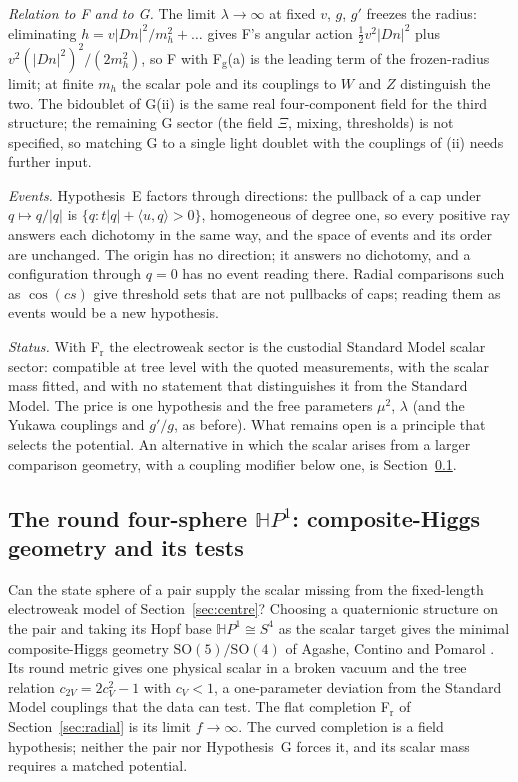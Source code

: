 \documentclass[aps,pra,onecolumn,superscriptaddress,nofootinbib,10pt]{revtex4-2}
\theoremstyle{definition}
\theoremstyle{remark}
\newcommand{\HH}{\mathbb{H}}
\newcommand{\ip}[2]{\langle #1,#2\rangle}
\newcommand{\SO}{\mathrm{SO}}
\begin{document}
\smallskip\noindent\emph{Relation to F and to G.}  The limit $\lambda\to\infty$ at fixed $v$, $g$, $g'$ freezes the radius:
eliminating $h=v\lvert Dn\rvert^2/m_h^2+\dots$ gives F's angular action $\tfrac12v^2\lvert Dn\rvert^2$ plus $v^2(\lvert Dn\rvert^2)^2/(2m_h^2)$, so F
with F$_{\mathrm g}$(a) is the leading term of the frozen-radius limit; at finite $m_h$ the scalar pole and its
couplings to $W$ and $Z$ distinguish the two.  The bidoublet of G(ii) is the same real four-component
field for the third structure; the remaining G sector (the field $\Xi$, mixing, thresholds) is not
specified, so matching G to a single light doublet with the couplings of (ii) needs further input.

\smallskip\noindent\emph{Events.}  Hypothesis~E factors through directions: the pullback of a cap under $q\mapsto q/\lvert q\rvert$
is $\{q:t\lvert q\rvert+\ip uq>0\}$, homogeneous of degree one, so every positive ray answers each dichotomy in the
same way, and the space of events and its order are unchanged.  The origin has no direction; it
answers no dichotomy, and a configuration through $q=0$ has no event reading there.  Radial
comparisons such as $\cos(cs)$ give threshold sets that are not pullbacks of caps; reading them as events
would be a new hypothesis.

\smallskip\noindent\emph{Status.}  With F$_{\mathrm r}$ the electroweak sector is the custodial Standard Model scalar sector:
compatible at tree level with the quoted measurements, with the scalar mass fitted, and with no
statement that distinguishes it from the Standard Model.  The price is one hypothesis and the free
parameters $\mu^2$, $\lambda$ (and the Yukawa couplings and $g'/g$, as before).  What remains open is a principle
that selects the potential.  An alternative in which the scalar arises from a larger comparison
geometry, with a coupling modifier below one, is Section~\ref{sec:hopfbase}.

\subsection{The round four-sphere $\HH P^1$: composite-Higgs geometry and its tests}\label{sec:hopfbase}
Can the state sphere of a pair supply the scalar missing from the fixed-length electroweak model of
Section~\ref{sec:centre}?  Choosing a quaternionic structure on the pair and taking its Hopf base $\HH P^1\cong S^4$ as the
scalar target gives the minimal composite-Higgs geometry $\SO(5)/\SO(4)$ of Agashe, Contino and Pomarol
\cite{n7:ACP}.  Its round metric gives one physical scalar in a broken vacuum and the tree relation
$c_{2V}=2c_V^2-1$ with $c_V<1$, a one-parameter deviation from the Standard Model couplings that the data can
test.  The flat completion F$_{\mathrm r}$ of Section~\ref{sec:radial} is its limit $f\to\infty$.  The curved completion is a field
hypothesis; neither the pair nor Hypothesis~G forces it, and its scalar mass requires a matched potential.
\end{document}

